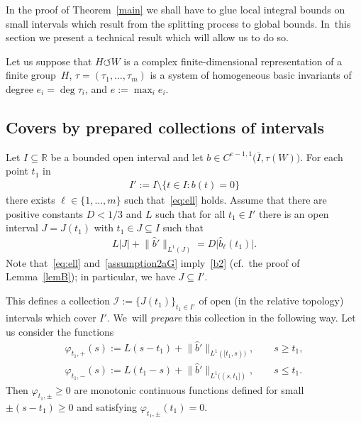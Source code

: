 \documentclass[11pt]{article}
\numberwithin{equation}{section}
\numberwithin{equation}{section}
\def\ta{\tau}
\def\vh{\varphi}
\def\R{\mathbb{R}}
\def\cI{\mathcal{I}}
\def\we{\hat}
\def\acts{\circlearrowleft}
\begin{document}
In the proof of Theorem~\ref{main} we shall have to glue local integral bounds on small intervals which result from the splitting
process to global bounds. In~this section we present a technical result which will
allow us to do so.

Let us suppose that $H \acts W$ is a complex finite-dimensional representation of a finite group~$H$,
$\ta= (\ta_1,\dots, \ta_m)$ is a system of homogeneous basic invariants of degree $e_i = \deg \ta_i$, and
$e := \max_i e_i$.



\subsection{Covers by prepared collections of intervals}\label{sec:preparation}
Let $I \subseteq \R$ be a bounded open interval and
let $b \in C^{e-1,1}\big(\overline I,\ta(W)\big)$.
For each point $t_1$ in
\begin{gather*}
 I' := I \setminus \{t \in I \colon b (t) = 0\}
\end{gather*}
there exists $\ell \in \{1, \dots, m\}$ such that~\eqref{eq:ell} holds.
Assume that there are positive constants $D < 1/3$ and $L$ such that
for all $t_1 \in I'$
there is
an open interval $J=J(t_1)$ with $t_1 \in J \subseteq I$ such that
\begin{gather} \label{assumption2aG}
 L | J| + \big\|\we b'\big\|_{L^1 (J)} = D\big |\we b_\ell(t_1)\big|.
\end{gather}
Note that~\eqref{eq:ell} and~\eqref{assumption2aG} imply~\eqref{b2} (cf.\ the proof of Lemma~\ref{lemB});
in particular, we have $J \subseteq I'$.

This defines a collection $\cI:=\{J(t_1)\}_{t_1\in I'}$ of open (in the relative topology) intervals which cover $I'$. We~will \emph{prepare} this collection in the following way.
Let us consider the functions
\begin{gather*}
 \vh_{t_1,+}(s) := L (s-t_1) + \big\|\we b'\big\|_{L^1 ([t_1,s))}, \qquad s\ge t_1,
 \\
 \vh_{t_1,-}(s) := L (t_1-s) + \big\|\we b'\big\|_{L^1 ((s,t_1])}, \qquad s\le t_1.
\end{gather*}
Then $\vh_{t_1,\pm} \ge 0$ are monotonic continuous functions defined for small $\pm (s - t_1)\ge 0$
and satisfying $\vh_{t_1,\pm}(t_1) = 0$.
\end{document}

